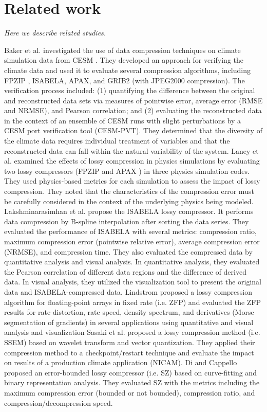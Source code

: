 \section{Related work}

\emph{Here we describe related studies.}

Baker et al. \cite{baker} investigated the use of data compression techniques on climate simulation data from CESM \cite{cesm}. They developed an approach for verifying the climate data and used it to evaluate several compression algorithms, including FPZIP \cite{fpzip}, ISABELA, APAX, and GRIB2 (with JPEG2000 compression). The verification process included: (1) quantifying the difference between the original and reconstructed data sets via measures of pointwise error, average error (RMSE and NRMSE), and Pearson correlation; and (2) evaluating the reconstructed data in the context of an ensemble of CESM runs with slight perturbations by a CESM port verification tool (CESM-PVT). They determined that the diversity of the climate data requires individual treatment of variables and that the reconstructed data can fall within the natural variability of the system.
Laney et al. \cite{laney2014assessing} examined the effects of lossy compression in physics simulations by evaluating two lossy compressors (FPZIP and APAX \cite{apax}) in three physics simulation codes. They used physics-based metrics for each simulation to assess the impact of lossy compression. They noted that the characteristics of the compression error must be carefully considered in the context of the underlying physics being modeled.
Lakshminarasimhan et  al. \cite{isabela} propose the ISABELA lossy compressor. It performs data compression by B-spline interpolation after sorting the data series. They evaluated the performance of ISABELA with several metrics: compression ratio, maximum compression error (pointwise relative error), average compression error (NRMSE), and compression time. They also evaluated the compressed data by quantitative analysis and visual analysis. In quantitative analysis, they evaluated the Pearson correlation of different data regions and the difference of derived data. In visual analysis, they utilized the visualization tool to present the original data and ISABELA-compressed data.
Lindstrom \cite{zfp} proposed a lossy compression algorithm for floating-point arrays in fixed rate (i.e. ZFP) and evaluated the ZFP results for rate-distortion, rate speed, density spectrum, and derivatives (Morse segmentation of gradients) in several applications using quantitative and visual analysis and visualization
Sasaki et al. \cite{ssem} proposed a lossy compression method (i.e. SSEM) based on wavelet transform and vector quantization. They applied their compression method to a checkpoint/restart technique and evaluate the impact on results of a production climate application (NICAM).
Di and Cappello \cite {sz} proposed an error-bounded lossy compressor (i.e. SZ) based on curve-fitting and binary representation analysis. They evaluated SZ with the metrics including the maximum compression error (bounded or not bounded), compression ratio, and compression/decompression speed.

